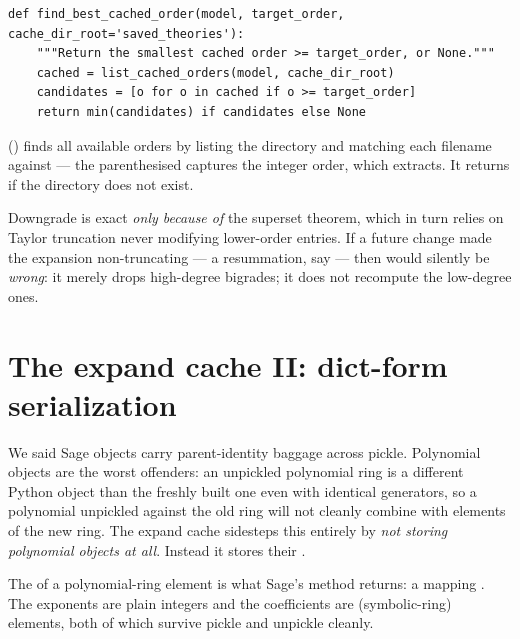 \begin{lstlisting}
def find_best_cached_order(model, target_order, cache_dir_root='saved_theories'):
    """Return the smallest cached order >= target_order, or None."""
    cached = list_cached_orders(model, cache_dir_root)
    candidates = [o for o in cached if o >= target_order]
    return min(candidates) if candidates else None
\end{lstlisting}

 () finds
all available orders by listing the directory and matching each filename
against  --- the parenthesised  captures the
integer order, which  extracts. It returns \code{[]} if
the directory does not exist.

\begin{gotcha}
Downgrade is exact \emph{only because of} the superset theorem, which in turn
relies on Taylor truncation never modifying lower-order entries. If a future
change made the expansion non-truncating --- a resummation, say --- then
 would silently be \emph{wrong}: it merely drops
high-degree bigrades; it does not recompute the low-degree ones.
\end{gotcha}

\section{The expand cache II: dict-form serialization}

We said Sage objects carry parent-identity baggage across pickle. Polynomial
objects are the worst offenders: an unpickled polynomial ring is a different
Python object than the freshly built one even with identical generators, so a
polynomial unpickled against the old ring will not cleanly combine with
elements of the new ring. The expand cache sidesteps this entirely by
\emph{not storing polynomial objects at all}. Instead it stores their
.

\begin{defn}
The  of a polynomial-ring element is what Sage's
 method returns: a mapping
. The exponents are plain integers and
the coefficients are  (symbolic-ring) elements, both of which survive
pickle and unpickle cleanly.
\end{defn}

